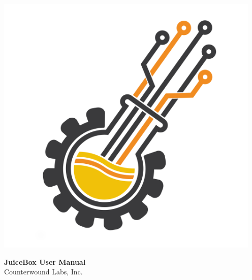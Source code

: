 \documentclass[10pt]{article}
\begin{document}
\date{\today} 							%
\begin{titlingpage} 						%
	\centering 							%
	\includegraphics[width=5in]{logo_2.png}
	\vspace{2cm}						%
\begin{center}							%
	\begin{Huge}
		\textbf{JuiceBox User Manual}\\ 
		\vspace{5mm}
		Counterwound Labs, Inc.
	\end{Huge}
\end{center}
\vfill
{\Large \thedate \par} 					%
\end{titlingpage} 
\end{document}
